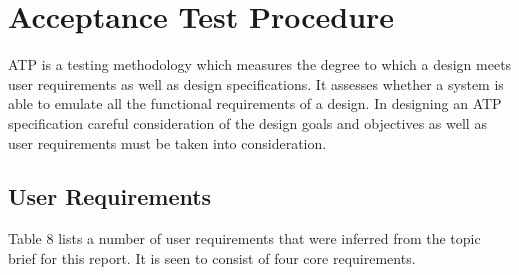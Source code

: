 \section{Acceptance Test Procedure}
ATP is a testing methodology which measures the degree to which a design meets user requirements as well as design specifications. It assesses whether a system is able to emulate all the functional requirements of a design. In designing an ATP specification careful consideration of the design goals and objectives as well as user requirements must be taken into consideration. 

\subsection{User Requirements}

Table 8 lists a number of user requirements that were inferred from the topic brief for this report. It is seen to consist of four core requirements.
